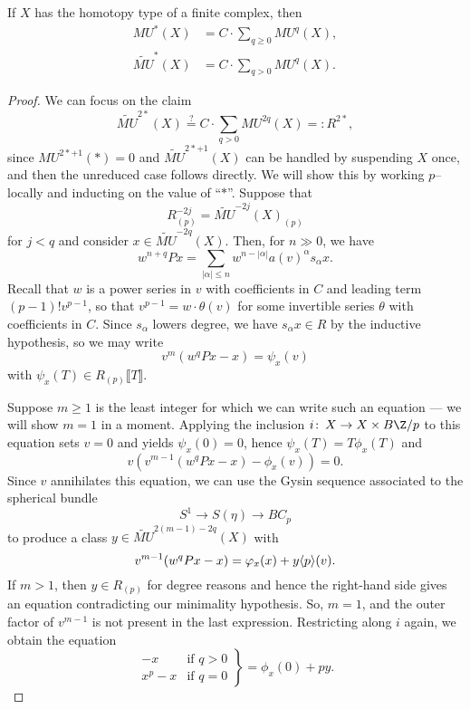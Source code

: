 \begin{theorem}
If $X$ has the homotopy type of a finite complex, then
\begin{align*}
MU^*(X) & = C \cdot \sum_{q \ge 0} MU^q(X), \\
\widetilde{MU}^*(X) & = C \cdot \sum_{q > 0} MU^q(X).
\end{align*}
\end{theorem}
\begin{proof}
We can focus on the claim \[\widetilde{MU}^{2*}(X) \stackrel{?}{=} C \cdot \sum_{q > 0} MU^{2q}(X) =: R^{2*},\] since $MU^{2*+1}(*) = 0$ and $\widetilde{MU}^{2*+1}(X)$ can be handled by suspending $X$ once, and then the unreduced case follows directly.  We will show this by working $p$--locally and inducting on the value of ``$*$''.  Suppose that \[R^{-2j}_{(p)} = \widetilde{MU}^{-2j}(X)_{(p)}\] for $j < q$ and consider $x \in \widetilde{MU}^{-2q}(X)$.  Then, for $n \gg 0$, we have \[w^{n+q} P x = \sum_{|\alpha| \le n} w^{n - |\alpha|} a(v)^\alpha s_\alpha x.\]  Recall that $w$ is a power series in $v$ with coefficients in $C$ and leading term $(p-1)! v^{p-1}$, so that $v^{p-1} = w \cdot \theta(v)$ for some invertible series $\theta$ with coefficients in $C$.  Since $s_\alpha$ lowers degree, we have $s_\alpha x \in R$ by the inductive hypothesis, so we may write \[v^m(w^qPx - x) = \psi_x(v)\] with $\psi_x(T) \in R_{(p)}\llbracket T \rrbracket$.

Suppose $m \ge 1$ is the least integer for which we can write such an equation --- we will show $m = 1$ in a moment.  Applying the inclusion $i\co X \to X \times B\Z/p$ to this equation sets $v = 0$ and yields $\psi_x(0) = 0$, hence $\psi_x(T) = T \phi_x(T)$ and \[v (v^{m-1}(w^qPx - x) - \phi_x(v)) = 0.\]  Since $v$ annihilates this equation, we can use the Gysin sequence associated to the spherical bundle \[S^1 \to S(\eta) \to BC_p\] to produce a class $y \in \widetilde{MU}^{2(m-1)-2q}(X)$ with \[v^{m-1}(w^q P x - x) = \varphi_x(x) + y \langle p\rangle(v).\]  If $m > 1$, then $y \in R_{(p)}$ for degree reasons and hence the right-hand side gives an equation contradicting our minimality hypothesis.  So, $m = 1$, and the outer factor of $v^{m-1}$ is not present in the last expression.  Restricting along $i$ again, we obtain the equation \[\left. \begin{array}{rr} -x & \text{if $q > 0$} \\ x^p - x & \text{if $q = 0$} \end{array} \right\} = \phi_x(0) + py.\]


\end{proof}
